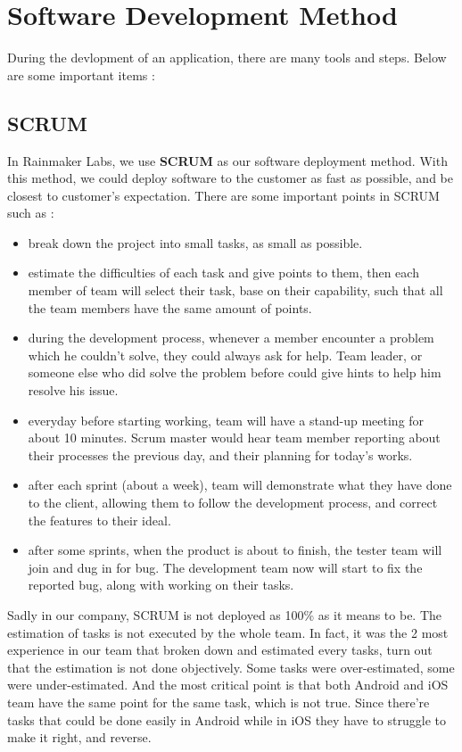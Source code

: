 \chapter{Software Development Method}

During the devlopment of an application, there are many tools and steps. Below are some important items :

\section{SCRUM}

In Rainmaker Labs, we use \textbf{SCRUM} as our software deployment method. With this method, we could deploy software to the customer as fast as possible, and be closest to customer's expectation. There are some important points in SCRUM such as :

\begin{itemize}
	\item break down the project into small tasks, as small as possible.
	\item estimate the difficulties of each task and give points to them, then each member of team will select their task, base on their capability, such that all the team members have the same amount of points.
	\item during the development process, whenever a member encounter a problem which he couldn't solve, they could always ask for help. Team leader, or someone else who did solve the problem before could give hints to help him resolve his issue.
	\item everyday before starting working, team will have a stand-up meeting for about 10 minutes. Scrum master would hear team member reporting about their processes the previous day, and their planning for today's works. 
	\item after each sprint (about a week), team will demonstrate what they have done to the client, allowing them to follow the development process, and correct the features to their ideal.
	\item after some sprints, when the product is about to finish, the tester team will join and dug in for bug. The development team now will start to fix the reported bug, along with working on their tasks.
\end{itemize}

Sadly in our company, SCRUM is not deployed as 100\% as it means to be. The estimation of tasks is not executed by the whole team. In fact, it was the 2 most experience in our team that broken down and estimated every tasks, turn out that the estimation is not done objectively. Some tasks were over-estimated, some were under-estimated. And the most critical point is that both Android and iOS team have the same point for the same task, which is not true. Since there're tasks that could be done easily in Android while in iOS they have to struggle to make it right, and reverse. 

